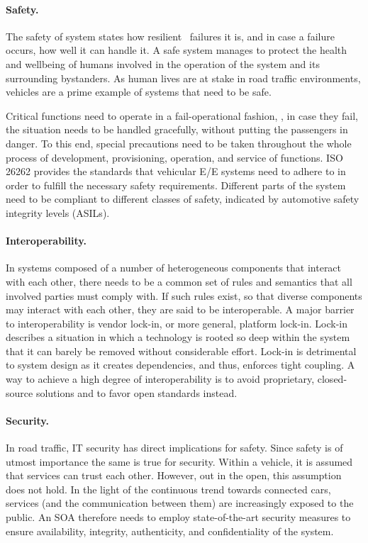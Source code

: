 \paragraph{Safety.}
The safety of system states how resilient \wrt\ failures it is, and in case a failure occurs, how well it can handle it. A safe system manages to protect the health and wellbeing of humans involved in the operation of the system and its surrounding bystanders.
As human lives are at stake in road traffic environments, vehicles are a prime example of systems that need to be safe.

Critical functions need to operate in a fail-operational fashion, \ie , in case they fail, the situation needs to be handled gracefully, without putting the passengers in danger. To this end, special precautions need to be taken throughout the whole process of development, provisioning, operation, and service of functions. ISO 26262 provides the standards that vehicular E/E systems need to adhere to in order to fulfill the necessary safety requirements. Different parts of the system need to be compliant to different classes of safety, indicated by automotive safety integrity levels (ASILs).

\paragraph{Interoperability.} 
In systems composed of a number of heterogeneous components that interact with each other, there needs to be a common set of rules and semantics that all involved parties must comply with. If such rules exist, so that diverse components may interact with each other, they are said to be interoperable.
A major barrier to interoperability is vendor lock-in, or more general, platform lock-in. Lock-in describes a situation in which a technology is rooted so deep within the system that it can barely be removed without considerable effort. Lock-in is detrimental to system design as it creates dependencies, and thus, enforces tight coupling. A way to achieve a high degree of interoperability is to avoid proprietary, closed-source solutions and to favor open standards instead.


\paragraph{Security.}
In road traffic, IT security has direct implications for safety. Since safety is of utmost importance the same is true for security. Within a vehicle, it is assumed that services can trust each other. However, out in the open, this assumption does not hold. In the light of the continuous trend towards connected cars, services (and the communication between them) are increasingly exposed to the public. An SOA therefore needs to employ state-of-the-art security measures to ensure availability, integrity, authenticity, and confidentiality of the system.

